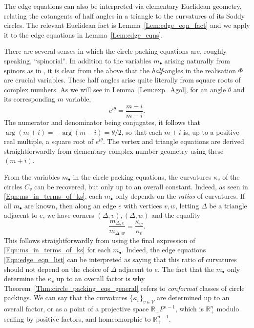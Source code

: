 \documentclass[12pt]{amsart}
\numberwithin{equation}{section}
\theoremstyle{named}
\newcommand{\refeqn}[1]{\eqref{Eqn:#1}}
\newcommand{\reflem}[1]{Lemma~\ref{Lem:#1}}
\newcommand{\refthm}[1]{Theorem~\ref{Thm:#1}}
\newcommand{\R}{\mathbb{R}}
\begin{document}
The edge equations can also be interpreted via elementary Euclidean geometry, relating the cotangents of half angles in a triangle to the curvatures of its Soddy circles. The relevant Euclidean fact is \reflem{edge_eqn_fact} and we apply it to the edge equations in \reflem{edge_eqns}.

There are several senses in which the circle packing equations are, roughly speaking, ``spinorial". In addition to the variables $m_\bullet$ arising naturally from spinors as in \cite{MZ25}, it is clear from the above that the \emph{half}-angles in the realisation $\Phi$ are crucial variables. These half angles arise quite literally from square roots of complex numbers. As we will see in \reflem{exp_Agol}, for an angle $\theta$ and its corresponding $m$ variable,
\[
e^{i\theta} = \frac{m + i}{m - i}.
\]
The numerator and denominator being conjugates, it follows that $\arg(m + i) = -\arg(m - i) = \theta/2$, so that each $m + i$ is, up to a positive real multiple, a square root of $e^{i\theta}$. The vertex and triangle equations are derived straightforwardly from elementary complex number geometry using these $(m + i)$.

From the variables $m_\bullet$ in the circle packing equations, the curvatures $\kappa_v$ of the circles $C_v$ can be recovered, but only up to an overall constant. Indeed, as seen in \refeqn{ms_in_terms_of_ks}, each $m_\bullet$ only depends on the \emph{ratios} of curvatures. If all $m_\bullet$ are known, then along an edge $e$ with vertices $v,w$, letting $\Delta$ be a triangle adjacent to $e$, we have corners $(\Delta,v), (\Delta,w)$ and the equality
\[
\frac{m_{\Delta,v}}{m_{\Delta,w}} = \frac{\kappa_w}{\kappa_v}.
\]
This follows straightforwardly from using the final expression of \refeqn{ms_in_terms_of_ks} for each $m_\bullet$. Indeed, the edge equations \refeqn{edge_eqn_list} can be interpreted as saying that this ratio of curvatures should not depend on the choice of $\Delta$ adjacent to $e$. The fact that the $m_\bullet$ only determine the $\kappa_v$ up to an overall factor is why \refthm{circle_packing_eqs_general} refers to \emph{conformal} classes of circle packings. We can say that the curvatures $\{\kappa_v\}_{v \in V}$ are determined up to an overall factor, or as a point of a projective space $\R_+ P^{n-1}$, which is $\R_+^n$ modulo scaling by positive factors, and homeomorphic to $\R_+^{n-1}$.
\end{document}
